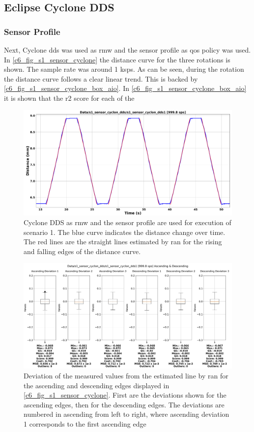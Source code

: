 \subsection{Eclipse Cyclone DDS}
\subsubsection{Sensor Profile}
Next, Cyclone \gls{dds} was used as \gls{rmw} and the sensor profile as \gls{qos} policy was used. In \autoref{c6_fig_s1_sensor_cyclone} the distance curve for the three rotations is shown. The sample rate was around 1 ksps. As can be seen, during the rotation the distance curve follows a clear linear trend. This is backed by \autoref{c6_fig_s1_sensor_cyclone_box_aio}. In \autoref{c6_fig_s1_sensor_cyclone_box_aio} it is shown that the \gls{r2} score for each of the 
\begin{figure}[h]
	\centering
	\includegraphics[width=1\textwidth]{Figures/c6/s1/s1_sensor_cyclon_dds.pdf}
	\caption{Cyclone DDS as \gls{rmw} and the sensor profile are used for execution of scenario 1.  The blue curve indicates the distance change over time. The red lines are the straight lines estimated by \gls{ran} for the rising and falling edges of the distance curve.}
	\label{c6_fig_s1_sensor_cyclone}
\end{figure}
\begin{figure}[h]
	\centering
	\includegraphics[width=1\textwidth]{Figures/c6/s1/s1_sensor_cyclone_dds_1_box_aio.pdf}
	\caption{Deviation of the measured values from the estimated line by \gls{ran} for the ascending and descending edges displayed in \autoref{c6_fig_s1_sensor_cyclone}. First are the deviations shown for the ascending edges, then for the descending edges. The deviations are numbered in ascending from left to right, where ascending deviation 1 corresponds to the first ascending edge}
	\label{c6_fig_s1_sensor_cyclone_box_aio}
\end{figure}
